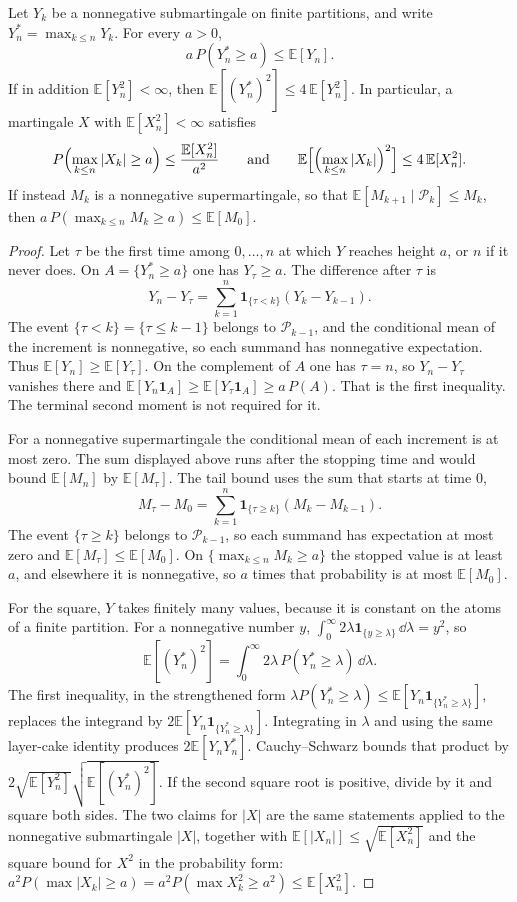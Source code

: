 \begin{theorem}[Doob]\label{thm:doob}
Let $Y_k$ be a nonnegative submartingale on finite partitions, and write $Y_n^*=\max_{k\le n}Y_k$. For every $a>0$,
\[
 a\,P(Y_n^*\ge a)\le\mathbb E[Y_n].
\]
If in addition $\mathbb E[Y_n^2]<\infty$, then $\mathbb E[(Y_n^*)^2]\le 4\,\mathbb E[Y_n^2]$. In particular, a martingale $X$ with $\mathbb E[X_n^2]<\infty$ satisfies
\[
 P\Bigl(\max_{k\le n}|X_k|\ge a\Bigr)\le\frac{\mathbb E[X_n^2]}{a^2}
 \qquad\text{and}\qquad
 \mathbb E\Bigl[\Bigl(\max_{k\le n}|X_k|\Bigr)^2\Bigr]\le 4\,\mathbb E[X_n^2].
\]
If instead $M_k$ is a nonnegative supermartingale, so that $\mathbb E[M_{k+1}\mid\mathcal P_k]\le M_k$, then $a\,P(\max_{k\le n}M_k\ge a)\le\mathbb E[M_0]$.
\end{theorem}
\begin{proof}
Let $\tau$ be the first time among $0,\ldots,n$ at which $Y$ reaches height $a$, or $n$ if it never does. On $A=\{Y_n^*\ge a\}$ one has $Y_\tau\ge a$. The difference after $\tau$ is
\[
 Y_n-Y_\tau=\sum_{k=1}^n\mathbf 1_{\{\tau<k\}}(Y_k-Y_{k-1}).
\]
The event $\{\tau<k\}=\{\tau\le k-1\}$ belongs to $\mathcal P_{k-1}$, and the conditional mean of the increment is nonnegative, so each summand has nonnegative expectation. Thus $\mathbb E[Y_n]\ge\mathbb E[Y_\tau]$. On the complement of $A$ one has $\tau=n$, so $Y_n-Y_\tau$ vanishes there and $\mathbb E[Y_n\mathbf 1_A]\ge\mathbb E[Y_\tau\mathbf 1_A]\ge a\,P(A)$. That is the first inequality. The terminal second moment is not required for it.

For a nonnegative supermartingale the conditional mean of each increment is at most zero. The sum displayed above runs after the stopping time and would bound $\mathbb E[M_n]$ by $\mathbb E[M_\tau]$. The tail bound uses the sum that starts at time $0$,
\[
 M_\tau-M_0=\sum_{k=1}^n\mathbf 1_{\{\tau\ge k\}}(M_k-M_{k-1}).
\]
The event $\{\tau\ge k\}$ belongs to $\mathcal P_{k-1}$, so each summand has expectation at most zero and $\mathbb E[M_\tau]\le\mathbb E[M_0]$. On $\{\max_{k\le n}M_k\ge a\}$ the stopped value is at least $a$, and elsewhere it is nonnegative, so $a$ times that probability is at most $\mathbb E[M_0]$.

For the square, $Y$ takes finitely many values, because it is constant on the atoms of a finite partition. For a nonnegative number $y$, $\int_0^\infty 2\lambda\mathbf 1_{\{y\ge\lambda\}}\,\dd\lambda=y^2$, so
\[
 \mathbb E[(Y_n^*)^2]=\int_0^\infty 2\lambda\,P(Y_n^*\ge\lambda)\,\dd\lambda.
\]
The first inequality, in the strengthened form $\lambda P(Y_n^*\ge\lambda)\le\mathbb E[Y_n\mathbf 1_{\{Y_n^*\ge\lambda\}}]$, replaces the integrand by $2\mathbb E[Y_n\mathbf 1_{\{Y_n^*\ge\lambda\}}]$. Integrating in $\lambda$ and using the same layer-cake identity produces $2\mathbb E[Y_n Y_n^*]$. Cauchy--Schwarz bounds that product by $2\sqrt{\mathbb E[Y_n^2]}\sqrt{\mathbb E[(Y_n^*)^2]}$. If the second square root is positive, divide by it and square both sides. The two claims for $|X|$ are the same statements applied to the nonnegative submartingale $|X|$, together with $\mathbb E[|X_n|]\le\sqrt{\mathbb E[X_n^2]}$ and the square bound for $X^2$ in the probability form: $a^2 P(\max|X_k|\ge a)=a^2 P(\max X_k^2\ge a^2)\le\mathbb E[X_n^2]$.
\end{proof}

